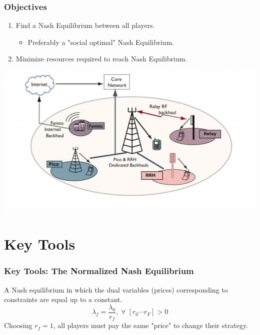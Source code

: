 \documentclass[10pt,tgadventor, onlymath]{beamer}
\begin{document}
\begin{frame}
\frametitle{Objectives}
\begin{enumerate}
\setlength\itemsep{2em}

\item Find a Nash Equilibrium between all players.
\begin{itemize}
\item Preferably a "social optimal" Nash Equilibrium.
\end{itemize}
\item Minimize resources required to reach Nash Equilibrium.
\end{enumerate}
\begin{center}
%
%
		\includegraphics[scale=.2]{het_net}

\end{center}

\end{frame}

\section{Key Tools}

\begin{frame}
\frametitle{Key Tools: The Normalized Nash Equilibrium}
A Nash equilibrium in which the dual variables (prices) corresponding to constraints are equal up to a constant.
\begin{equation}
\lambda_f = \frac{\lambda_{0}}{ r_f}, \; \forall \; [r_0 \cdots r_F] > 0 
\end{equation}
Choosing $r_f =1$, all players must pay the same "price" to change their strategy. 
\end{frame}
\end{document}
